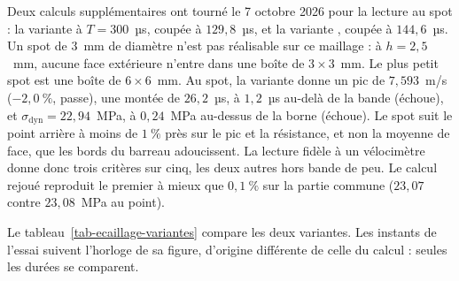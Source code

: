 Deux calculs supplémentaires ont tourné le 7 octobre 2026 pour la lecture au spot : la variante  à $T = 300$~µs, coupée à $129{,}8$~µs, et la variante , coupée à $144{,}6$~µs. Un spot de 3~mm de diamètre n'est pas réalisable sur ce maillage : à $h = 2{,}5$~mm, aucune face extérieure n'entre dans une boîte de $3 \times 3$~mm. Le plus petit spot est une boîte de $6 \times 6$~mm. Au spot, la variante  donne un pic de $7{,}593$~m/s ($-2{,}0~\%$, passe), une montée de $26{,}2$~µs, à $1{,}2$~µs au-delà de la bande (échoue), et $\sigma_\text{dyn} = 22{,}94$~MPa, à $0{,}24$~MPa au-dessus de la borne (échoue). Le spot suit le point arrière à moins de $1~\%$ près sur le pic et la résistance, et non la moyenne de face, que les bords du barreau adoucissent. La lecture fidèle à un vélocimètre donne donc trois critères sur cinq, les deux autres hors bande de peu. Le calcul  rejoué reproduit le premier à mieux que $0{,}1~\%$ sur la partie commune ($23{,}07$ contre $23{,}08$~MPa au point).

Le tableau~\ref{tab-ecaillage-variantes} compare les deux variantes. Les instants de l'essai suivent l'horloge de sa figure, d'origine différente de celle du calcul : seules les durées se comparent.

